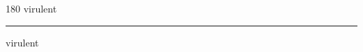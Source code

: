 
\begin{frame}
\begin{center}
\begin{turn}{180}
{\fontsize{2.5cm}{1em}\selectfont virulent}
\end{turn}
\vspace{1em}\par  
\hrule
\vspace{1em}\par  
{\fontsize{2.5cm}{1em}\selectfont virulent}
\end{center}
\end{frame}
